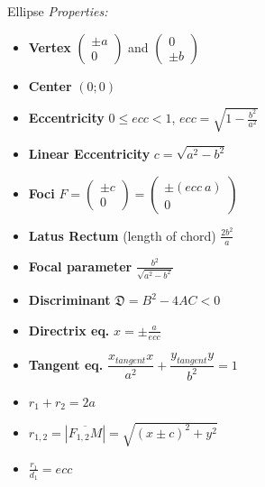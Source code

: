 \documentclass[aspectratio=169]{beamer}
\begin{document}
\begin{frame}[t]{Ellipse}
    \vspace{-0.5cm}
    \textit{Properties:}
    \begin{multicols}{3}
        \begin{itemize}
            \item \textbf{Vertex} $\begin{pmatrix} \pm a\\0 \end{pmatrix}$ and $\begin{pmatrix} 0\\\pm b \end{pmatrix}$
            \item \textbf{Center} $(0;0)$
            \item \textbf{Eccentricity} $0 \leq ecc < 1$, $ecc = \sqrt{1 - \frac{b^2}{a^2}}$
            \item \textbf{Linear Eccentricity} $c = \sqrt{a^2-b^2}$
            \item \textbf{Foci} $F = \begin{pmatrix} \pm c\\ 0 \end{pmatrix} = \begin{pmatrix} \pm(ecc\ a)\\ 0 \end{pmatrix}$
            \item \textbf{Latus Rectum} (length of chord) $\frac{2b^2}{a}$
            \item \textbf{Focal parameter}  $\frac{b^2}{\sqrt{a^2-b^2}}$
            \item \textbf{Discriminant} $\mathfrak{D} = B^2 - 4AC < 0$
            \item \textbf{Directrix eq.} $x = \pm \frac{a}{ecc}$
            \item \textbf{Tangent eq.} $\dfrac{x_{tangent} x}{a^2}+\dfrac{y_{tangent} y}{b^2}=1$
            \item $r_1 + r_2 = 2a$
            \item $r_{1,2} = |\overline{F_{1,2}M}|=\sqrt{(x \pm c)^2+y^2}$
            \item $\frac{r_1}{d_1}=ecc$
            \end{itemize}
    \end{multicols}
    \end{frame}
\end{document}
